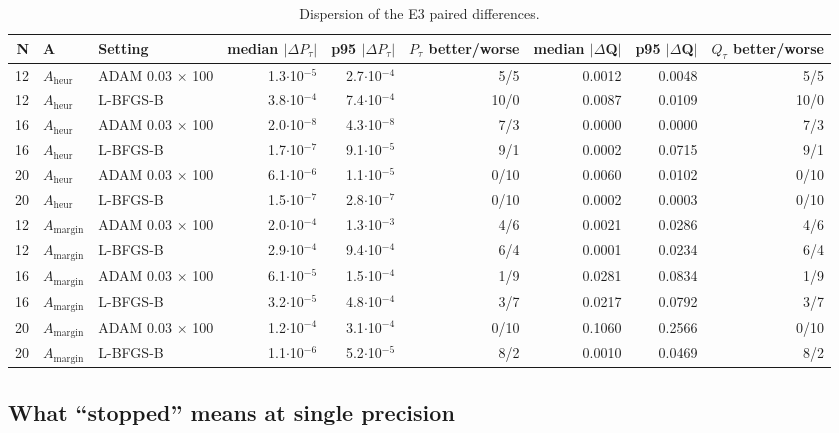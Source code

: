 \documentclass[journal]{IEEEtran}
\begin{document}
\begin{table}[!t]
\centering
\scriptsize
\caption{Dispersion of the E3 paired differences.}
\label{tab:S23}
\begin{tabular}{rllrrrrrr}
\toprule
N & A & Setting & median $|$$\Delta$$P_{\tau}$$|$ & p95 $|$$\Delta$$P_{\tau}$$|$ & $P_{\tau}$ better/worse & median $|$$\Delta$Q$|$ & p95 $|$$\Delta$Q$|$ & $Q_{\tau}$ better/worse \\
\midrule
12 & $A_{\mathrm{heur}}$ & ADAM 0.03 $\times$ 100 & 1.3$\cdot$10$^{-5}$ & 2.7$\cdot$10$^{-4}$ & 5/5 & 0.0012 & 0.0048 & 5/5 \\
12 & $A_{\mathrm{heur}}$ & L-BFGS-B & 3.8$\cdot$10$^{-4}$ & 7.4$\cdot$10$^{-4}$ & 10/0 & 0.0087 & 0.0109 & 10/0 \\
16 & $A_{\mathrm{heur}}$ & ADAM 0.03 $\times$ 100 & 2.0$\cdot$10$^{-8}$ & 4.3$\cdot$10$^{-8}$ & 7/3 & 0.0000 & 0.0000 & 7/3 \\
16 & $A_{\mathrm{heur}}$ & L-BFGS-B & 1.7$\cdot$10$^{-7}$ & 9.1$\cdot$10$^{-5}$ & 9/1 & 0.0002 & 0.0715 & 9/1 \\
20 & $A_{\mathrm{heur}}$ & ADAM 0.03 $\times$ 100 & 6.1$\cdot$10$^{-6}$ & 1.1$\cdot$10$^{-5}$ & 0/10 & 0.0060 & 0.0102 & 0/10 \\
20 & $A_{\mathrm{heur}}$ & L-BFGS-B & 1.5$\cdot$10$^{-7}$ & 2.8$\cdot$10$^{-7}$ & 0/10 & 0.0002 & 0.0003 & 0/10 \\
12 & $A_{\mathrm{margin}}$ & ADAM 0.03 $\times$ 100 & 2.0$\cdot$10$^{-4}$ & 1.3$\cdot$10$^{-3}$ & 4/6 & 0.0021 & 0.0286 & 4/6 \\
12 & $A_{\mathrm{margin}}$ & L-BFGS-B & 2.9$\cdot$10$^{-4}$ & 9.4$\cdot$10$^{-4}$ & 6/4 & 0.0001 & 0.0234 & 6/4 \\
16 & $A_{\mathrm{margin}}$ & ADAM 0.03 $\times$ 100 & 6.1$\cdot$10$^{-5}$ & 1.5$\cdot$10$^{-4}$ & 1/9 & 0.0281 & 0.0834 & 1/9 \\
16 & $A_{\mathrm{margin}}$ & L-BFGS-B & 3.2$\cdot$10$^{-5}$ & 4.8$\cdot$10$^{-4}$ & 3/7 & 0.0217 & 0.0792 & 3/7 \\
20 & $A_{\mathrm{margin}}$ & ADAM 0.03 $\times$ 100 & 1.2$\cdot$10$^{-4}$ & 3.1$\cdot$10$^{-4}$ & 0/10 & 0.1060 & 0.2566 & 0/10 \\
20 & $A_{\mathrm{margin}}$ & L-BFGS-B & 1.1$\cdot$10$^{-6}$ & 5.2$\cdot$10$^{-5}$ & 8/2 & 0.0010 & 0.0469 & 8/2 \\
\bottomrule
\end{tabular}
\end{table}


\subsection{What ``stopped'' means at single precision}
\end{document}
